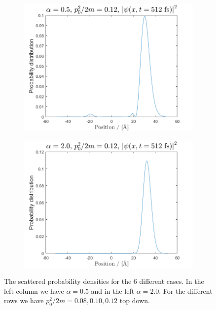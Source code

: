 \begin{figure}[H]
\begin{subfigure}[t]{0.47\textwidth}
	\includegraphics[width=\textwidth]{graphics/task3/a1e3.png}
	\caption{}
	\label{fig:3_e}
\end{subfigure}
\begin{subfigure}[t]{0.47\textwidth}
	\includegraphics[width=\textwidth]{graphics/task3/a2e3.png}
	\caption{}
	\label{fig:3_f}
\end{subfigure}

\caption{The scattered probability densities for the 6 different cases. In the left column we have $\alpha = 0.5$ and in the left $\alpha=2.0$. For the different rows we have $p_0^2/2m=0.08, 0.10, 0.12$ top down. }
\label{fig:3}
\end{figure}

